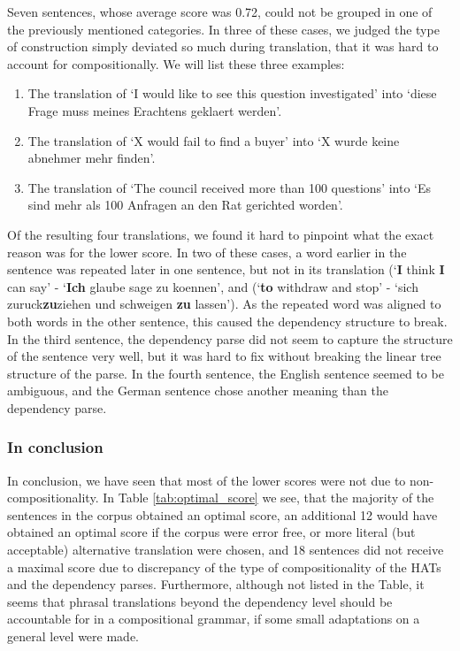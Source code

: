 Seven sentences, whose average score was 0.72, could not be grouped in one of the previously mentioned categories. In three of these cases, we judged the type of construction simply deviated so much during translation, that it was hard to account for compositionally. We will list these three examples:\begin{enumerate}
\item The translation of `I would like to see this question investigated' into `diese Frage muss meines Erachtens geklaert werden'.
\item The translation of `X would fail to find a buyer' into `X wurde keine abnehmer mehr finden'.
\item The translation of `The council received more than 100 questions' into `Es sind mehr als 100 Anfragen an den Rat gerichted worden'.
\end{enumerate} 

Of the resulting four translations, we found it hard to pinpoint what the exact reason was for the lower score. In two of these cases, a word earlier in the sentence was repeated later in one sentence, but not in its translation (`\textbf{I} think \textbf{I} can say' - `\textbf{Ich} glaube sage zu koennen', and (`\textbf{to} withdraw and stop' - `sich zuruck\textbf{zu}ziehen und schweigen \textbf{zu} lassen'). As the repeated word was aligned to both words in the other sentence, this caused the dependency structure to break. In the third sentence, the dependency parse did not seem to capture the structure of the sentence very well, but it was hard to fix without breaking the linear tree structure of the parse. In the fourth sentence, the English sentence seemed to be ambiguous, and the German sentence chose another meaning than the dependency parse.

\subsubsection{In conclusion}

In conclusion, we have seen that most of the lower scores were not due to non-compositionality. In Table \ref{tab:optimal_score} we see, that the majority of the sentences in the corpus obtained an optimal score, an additional 12 would have obtained an optimal score if the corpus were error free, or more literal (but acceptable) alternative translation were chosen, and 18 sentences did not receive a maximal score due to discrepancy of the type of compositionality of the HATs and the dependency parses. Furthermore, although not listed in the Table, it seems that phrasal translations beyond the dependency level should be accountable for in a compositional grammar, if some small adaptations on a general level were made.

